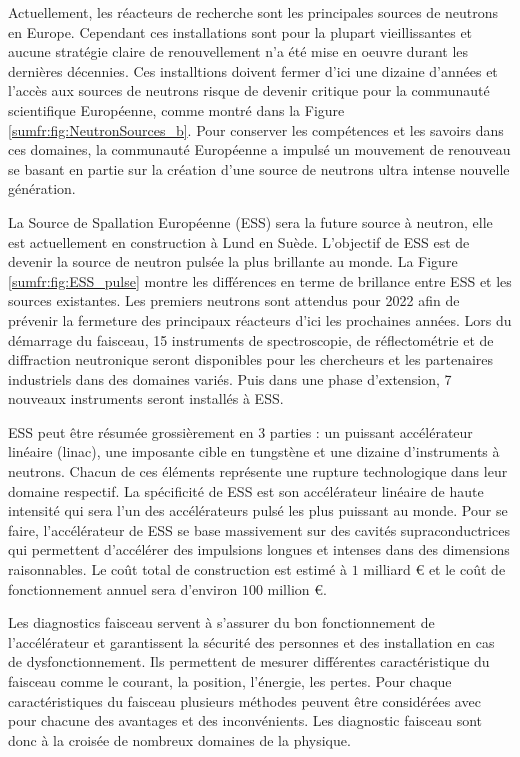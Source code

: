 Actuellement, les réacteurs de recherche sont les principales sources de neutrons en Europe. Cependant ces installations sont pour la plupart vieillissantes et aucune stratégie claire de renouvellement n'a été mise en oeuvre durant les dernières décennies. Ces installtions doivent fermer d'ici une dizaine d'années et l'accès aux sources de neutrons risque de devenir critique pour la  communauté scientifique Européenne, comme montré dans la Figure \ref{sumfr:fig:NeutronSources_b}. Pour conserver les compétences et les savoirs dans ces domaines, la communauté Européenne a impulsé un mouvement de renouveau se basant en partie sur la création d'une source de neutrons ultra intense nouvelle génération.

La Source de Spallation Européenne (ESS) sera la future source à neutron, elle est actuellement en construction à Lund en Suède. L’objectif de ESS est de devenir la source de neutron pulsée la plus brillante au monde. La Figure \ref{sumfr:fig:ESS_pulse} montre les différences en terme de brillance entre ESS et les sources existantes. Les premiers neutrons sont attendus pour 2022 afin de prévenir la fermeture des principaux réacteurs  d’ici les prochaines années. Lors du démarrage du faisceau, 15 instruments de spectroscopie, de réflectométrie et de diffraction neutronique seront disponibles pour les chercheurs et les partenaires industriels dans des domaines variés. Puis dans une phase d’extension, 7 nouveaux instruments seront installés à ESS.


ESS peut être résumée grossièrement en 3 parties : un puissant accélérateur linéaire (linac), une imposante cible en tungstène et une dizaine d’instruments à neutrons. Chacun de ces éléments représente une rupture technologique dans leur domaine respectif. La spécificité de ESS est son accélérateur linéaire de haute intensité qui sera l’un des accélérateurs pulsé les plus puissant au monde. Pour se faire, l’accélérateur de ESS se base massivement sur des cavités supraconductrices qui permettent d'accélérer des impulsions longues et intenses dans des dimensions raisonnables. Le coût total de construction est estimé à $1$ milliard € et le coût de fonctionnement annuel sera d'environ $100$ million €.


Les diagnostics faisceau servent à s’assurer du bon fonctionnement de l'accélérateur et garantissent la sécurité des personnes et des installation en cas de dysfonctionnement. Ils permettent de mesurer différentes caractéristique du faisceau comme le courant, la position, l’énergie, les pertes. Pour chaque caractéristiques du faisceau plusieurs méthodes peuvent être considérées avec pour chacune des avantages et des inconvénients. Les diagnostic faisceau sont donc à la croisée de nombreux domaines de la physique.

